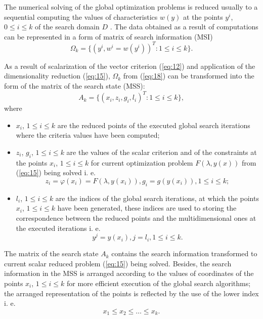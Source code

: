 \documentclass{svproc}
\begin{document}
The numerical solving of the global optimization problems is reduced usually to a sequential computing the values of characteristics $w(y)$ at the points $y^i$, $0\leq i \leq k$ of the search domain $D$ \cite{x18,x22,x23,x24,x25}. The data obtained as a result of computations can be represented in a form of matrix of search information (MSI)
\begin{equation}
\label{eq:18}
\Omega_k=\{(y^i,w^i=w(y^i ) )^T:1 \leq i \leq k\}.
\end{equation}

As a result of scalarization of the vector criterion (\ref{eq:12}) and application of the dimensionality reduction (\ref{eq:15}), $\Omega_k$ from (\ref{eq:18}) can be transformed into the form of the matrix of the search state (MSS):
\begin{equation}
\label{eq:19}
A_k=\{(x_i,z_i,g_i,l_i )^T:1 \leq i \leq k\},
\end{equation}
where
\begin{itemize}
	\item $x_i$, $1 \leq i \leq k$ are the reduced points of the executed global search iterations where the criteria values have been computed; 
	\item $z_i$, $g_i$, $1 \leq i \leq k$ are the values of the scalar criterion and of the constraints at the points $x_i$, $1 \leq i \leq k$ for current optimization problem $F(\lambda,y(x))$ from (\ref{eq:15}) being solved i. e.
\begin{equation}
z_i = \varphi(x_i) =F(\lambda,y(x_i)),  g_i=g(y(x_i )),  1\leq i \leq k;
\end{equation}
	\item $l_i$, $1 \leq i \leq k$ are the indices of the global search iterations, at which the points $x_i$, $1 \leq i \leq k$ have been generated, these indices are used to storing the correspondence between the reduced points and the multidimensional ones at the executed iterations i. e.
\begin{equation}
y^j = y(x_i), j = l_i, 1 \leq i \leq k.
\end{equation}

\end{itemize}

The matrix of the search state $A_k$ contains the search information transformed to current scalar reduced problem (\ref{eq:15}) being solved. Besides, the search information in the MSS is arranged according to the values of coordinates of the points $x_i$, $1 \leq i \leq k$ for more efficient execution of the global search algorithms; the arranged representation of the points is reflected by the use of the lower index i. e.
\begin{equation}
x_1 \leq x_2 \leq \dots \leq x_k.
\end{equation}
\end{document}
